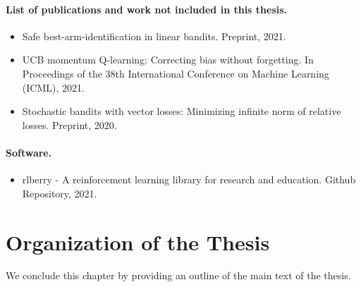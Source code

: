 \paragraph{List of publications and work not included in this thesis.}

\begin{itemize}
    \item Safe best-arm-identification in linear bandits. Preprint, 2021.~\citep{shang2021safe}
    \item UCB momentum Q-learning: Correcting bias without forgetting. In Proceedings of the 38th International Conference on Machine Learning (ICML), 2021.~\citep{menard2021ucbmq}
    \item Stochastic bandits with vector losses: Minimizing infinite norm of relative losses. Preprint, 2020.~\citep{shang2020vector}
\end{itemize}

\paragraph{Software.}

\begin{itemize}
    \item rlberry - A reinforcement learning library for research and education. Github Repository, 2021.~\citep{rlberry2021}
\end{itemize}

\section{Organization of the Thesis}\label{sec:intro.organization}

We conclude this chapter by providing an outline of the main text of the thesis.

% 
% 

